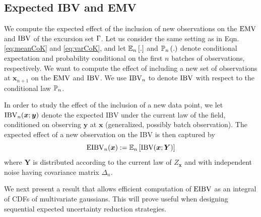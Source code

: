 \documentclass[aoas]{imsart}
\begin{document}
\subsection{Expected IBV and EMV}
\label{sec:eibv}
We compute the expected effect of the inclusion of new observations on the $\mathrm{EMV}$ and $\mathrm{IBV}$ of the excursion set $\Gamma$. Let us consider the same setting as in Eqn. \eqref{eq:meanCoK} and \eqref{eq:varCoK}, and let 
$\mathbb{E}_{n} \left[.\right]$ and $\mathbb{P}_{n} \left(.\right)$ denote conditional expectation
and probability conditional on the first $n$ batches of observations, respectively. We want to compute the effect of including a new set of observations at $\bm{x}_{n+1}$ on the $\mathrm{EMV}$ and $\mathrm{IBV}$. We use $\operatorname{IBV}_{n}$ to denote $\operatorname{IBV}$ with respect to the conditional law $\mathbb{P}_{n}$.

\medskip

In order to study the effect of the inclusion of a new data point, we let
$
\operatorname{IBV}_{n}(\bm{x}; \bm{y})
$
denote the expected IBV under the current law of the field, conditioned on observing $\bm{y}$ at $\bm{x}$ (generalized, possibly batch observation). The expected effect of a new observation on the IBV is then captured by
\begin{equation}\label{def:eibv}
    \currentEIBV(\bm{x}):=\mathbb{E}_{\stage}\left[\mbox{IBV}(\bm{x}; \bm{Y})\right]
\end{equation}
where $\bm{Y}$ is distributed according to the current law of $Z_{\bm{x}}$ and with independent noise having covariance matrix $\Delta_n$.

We next present a result that allows efficient computation of $\operatorname{EIBV}$ as an integral of CDFs of multivariate gaussians. This will prove useful when designing sequential expected uncertainty reduction strategies.
\end{document}
